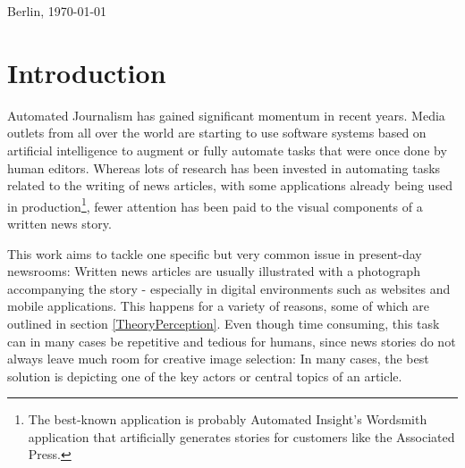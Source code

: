 \documentclass[11pt,a4paper,twoside]{article}
\begin{document}
\bigskip\noindent Berlin, \today

\vspace{4ex}\noindent\makebox[7cm]{\dotfill}


\cleardoublepage
\pagestyle{fancy}
\setcounter{page}{1}

\tableofcontents


\cleardoublepage

\setcounter{page}{1}
\fancyhead[LE,RO]{\rightmark}
\fancyfoot[LE,RO]{\thepage}

\section{Introduction}

Automated Journalism has gained significant momentum in recent years. Media outlets from all over the world are starting to use software systems based on artificial intelligence to augment or fully automate tasks that were once done by human editors. Whereas lots of research has been invested in automating tasks related to the writing of news articles, with some applications already being used in production\footnote{The best-known application is probably Automated Insight's Wordsmith application that artificially generates stories for customers like the Associated Press.\cite{AssociatedPressAutomatedInsights}}, fewer attention has been paid to the visual components of a written news story. 

This work aims to tackle one specific but very common issue in present-day newsrooms: Written news articles are usually illustrated with a photograph accompanying the story - especially in digital environments such as websites and mobile applications. This happens for a variety of reasons, some of which are outlined in section \ref{TheoryPerception}. Even though time consuming, this task can in many cases be repetitive and tedious for humans, since news stories do not always leave much room for creative image selection: In many cases, the best solution is depicting one of the key actors or central topics of an article.
\end{document}
